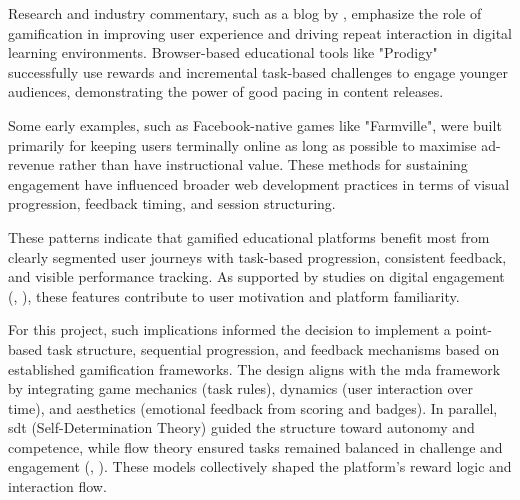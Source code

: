 Research and industry commentary, such as a blog by \textcite{UXdesign}, emphasize the role of gamification in improving user experience and driving repeat interaction in digital learning environments. 
Browser-based educational tools like "Prodigy" successfully use rewards and incremental task-based challenges to engage younger audiences, demonstrating the power of good pacing in content releases.

Some early examples, such as Facebook-native games like "Farmville", were built primarily for keeping users terminally online as long as possible to maximise ad-revenue rather than have instructional value. 
These methods for sustaining engagement have influenced broader web development practices in terms of visual progression, feedback timing, and session structuring.

These patterns indicate that gamified educational platforms benefit most from clearly segmented user journeys with task-based progression, consistent feedback, and visible performance tracking. 
As supported by studies on digital engagement (\cite{userEngagement}, \cite{gamificationEngagement}), these features contribute to user motivation and platform familiarity. 

For this project, such implications informed the decision to implement a point-based task structure, sequential progression, and feedback mechanisms based on established gamification frameworks. 
The design aligns with the \acrshort{mda} framework by integrating game mechanics (task rules), dynamics (user interaction over time), and aesthetics (emotional feedback from scoring and badges). 
In parallel, \acrshort{sdt} (Self-Determination Theory) guided the structure toward autonomy and competence, while flow theory ensured tasks remained balanced in challenge and engagement (\cite{sdt}, \cite{flow}). 
These models collectively shaped the platform's reward logic and interaction flow. 

